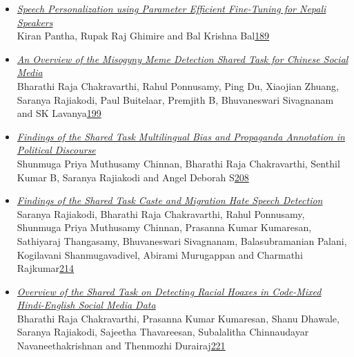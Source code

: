 \documentclass[11pt,oneside]{book}
\begin{document}
\begin{itemize}[leftmargin=*,label={}]
       \item \hyperlink{page.189}{\emph{Speech Personalization using Parameter Efficient Fine-Tuning for Nepali Speakers}}\\ \hspace*{2em} Kiran Pantha, Rupak Raj Ghimire and Bal Krishna Bal\dotfill \hyperlink{page.189}{189}
       \item \hyperlink{page.199}{\emph{An Overview of the Misogyny Meme Detection Shared Task for Chinese Social Media}}\\ \hspace*{2em} Bharathi Raja Chakravarthi, Rahul Ponnusamy, Ping Du, Xiaojian Zhuang, Saranya Rajiakodi, Paul Buitelaar, Premjith B, Bhuvaneswari Sivagnanam and SK Lavanya\dotfill \hyperlink{page.199}{199}
       \item \hyperlink{page.208}{\emph{Findings of the Shared Task Multilingual Bias and Propaganda Annotation in Political Discourse}}\\ \hspace*{2em} Shunmuga Priya Muthusamy Chinnan, Bharathi Raja Chakravarthi, Senthil Kumar B, Saranya Rajiakodi and Angel Deborah S\dotfill \hyperlink{page.208}{208}
       \item \hyperlink{page.214}{\emph{Findings of the Shared Task Caste and Migration Hate Speech Detection}}\\ \hspace*{2em} Saranya Rajiakodi, Bharathi Raja Chakravarthi, Rahul Ponnusamy, Shunmuga Priya Muthusamy Chinnan, Prasanna Kumar Kumaresan, Sathiyaraj Thangasamy, Bhuvaneswari Sivagnanam, Balasubramanian Palani, Kogilavani Shanmugavadivel, Abirami Murugappan and Charmathi Rajkumar\dotfill \hyperlink{page.214}{214}
       \item \hyperlink{page.221}{\emph{Overview of the Shared Task on Detecting Racial Hoaxes in Code-Mixed Hindi-English Social Media Data}}\\ \hspace*{2em} Bharathi Raja Chakravarthi, Prasanna Kumar Kumaresan, Shanu Dhawale, Saranya Rajiakodi, Sajeetha Thavareesan, Subalalitha Chinnaudayar Navaneethakrishnan and Thenmozhi Durairaj\dotfill \hyperlink{page.221}{221}

\end{itemize}
\end{document}
